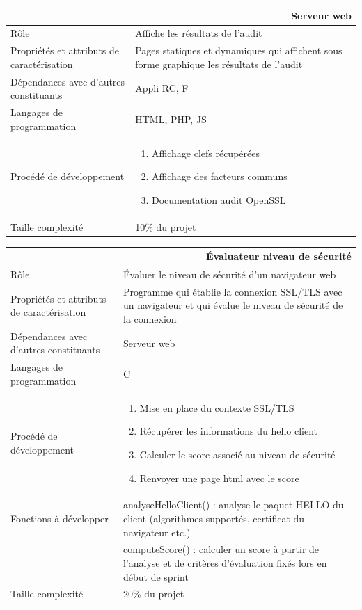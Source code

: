 \documentclass[a4paper,11pt,french]{article}
\begin{document}
\begin{center}
	\vspace*{0.7cm}
	\begin{tabularx}{16cm}{|l|X|}
	\hline
	\multicolumn{2}{|r|}{\textbf{Serveur web}}\\
	\hline
	R\^ole & Affiche les résultats de l'audit \\
	\hline
	Propriétés et attributs de caractérisation & Pages statiques et dynamiques qui affichent sous forme graphique les résultats de l'audit \\
	\hline
	Dépendances avec d'autres constituants & Appli RC, F \\
	\hline
	Langages de programmation & HTML, PHP, JS\\
	\hline
	Procédé de développement & \begin{enumerate} \item Affichage clefs récupérées \item Affichage des facteurs communs \item Documentation audit OpenSSL\end{enumerate}\\
	\hline
	Taille complexité & 10\% du projet\\
	\hline
	\end{tabularx}
\end{center}

\begin{center}
	\vspace*{0.7cm}
	\begin{tabularx}{16cm}{|l|X|}
	\hline
	\multicolumn{2}{|r|}{\textbf{Évaluateur niveau de sécurité}}\\
	\hline
	R\^ole & Évaluer le niveau de sécurité d'un navigateur web \\
	\hline
	Propriétés et attributs de caractérisation & Programme qui établie la connexion SSL/TLS avec un navigateur et qui évalue le niveau de sécurité de la connexion\\
	\hline
	Dépendances avec d'autres constituants & Serveur web \\
	\hline
	Langages de programmation & C\\
	\hline
	Procédé de développement & \begin{enumerate} \item Mise en place du contexte SSL/TLS \item Récupérer les informations du hello client \item Calculer le score associé au niveau de sécurité \item Renvoyer une page html avec le score \end{enumerate}\\
	\hline
	Fonctions à développer & analyseHelloClient() : analyse le paquet HELLO du client (algorithmes supportés, certificat du navigateur etc.)\\
	& computeScore() : calculer un score à partir de l'analyse et de critères d'évaluation fixés lors en début de sprint\\
	\hline
	Taille complexité & 20\% du projet\\
	\hline
	\end{tabularx}
\end{center}
\end{document}
